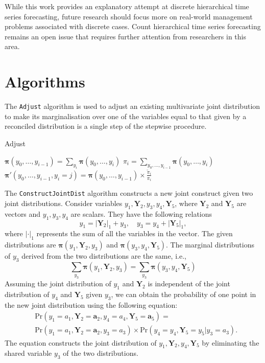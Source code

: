 \documentclass[a4paper,review,12pt,authoryear]{elsarticle}
\let\code=\texttt
\newcommand{\bY}{\mathbf{Y}}
\newcommand{\bpi}{\bm{\pi}}
\begin{document}
     
     While this work provides an explanatory attempt at discrete hierarchical time series forecasting, future research should focus more on real-world management problems associated with discrete cases. Count hierarchical time series forecasting remains an open issue that requires further attention from researchers in this area.


\newpage

\appendix

\section{Algorithms}
\label{appendix:adjust}

The \code{Adjust} algorithm is used to adjust an existing multivariate joint distribution to make its marginalisation over one of the variables equal to that given by a reconciled distribution is a single step of the stepwise procedure.

\begin{algorithm}[H]
  \label{alg:adjust}
  \caption{Adjust}
  \Input{$\bpi(y_0,y_1,\dots,y_i), \tilde\pi_i, y_i \in \{0,1,\dots,k_i\}$}

  $\bpi(y_0,\dots,y_{i-1}) = \sum_{y_i}\bpi(y_0,\dots,y_i)$\;
  $\pi_i = \sum_{y_0,\dots,y_{i-1}}\bpi(y_0,\dots,y_i)$ \;
   {
    $\bpi'(y_0,\dots,y_{i-1}, y_i=j) = \bpi(y_0,\dots,y_{i-1}) \times \frac{\tilde\pi_i}{\pi_i}$ \;
  }

  \Output{$\bpi'(y_0,\dots,y_i)$}
  
 \end{algorithm}


 The \code{ConstructJointDist} algorithm constructs a new joint construct given two joint distributions. 
 Consider variables $y_1, \bY_2, y_3, y_4, \bY_5$, where $\bY_2$ and $\bY_5$ are vectors and $y_1, y_3, y_4$ are scalars. 
 They have the following relations
 \[
  y_1 = |\bY_2|_1 + y_3, \quad y_3 = y_4 + |\bY_5|_1,
 \]
 where $|\cdot|_1$ represents the sum of all the variables in the vector.
 The given distributions are $\bpi(y_1, \bY_2, y_3)$ and $\bpi(y_3, y_4, \bY_5)$.
 The marginal distributions of $y_3$ derived from the two distributions are the same, i.e.,
 \[
  \sum_{y_3} \bpi(y_1, \bY_2, y_3) = \sum_{y_3}\bpi(y_3, y_4, \bY_5)
\]
 Assuming the joint distribution of $y_1$ and $\bY_2$ is independent of the joint distribution of $y_4$ and $\bY_5$ given $y_3$, we can obtain the probability of one point in the new joint distribution using the following equation: \[
   \begin{aligned}
  &\text{Pr}(y_1=a_1,\bY_2=\mathbf{a}_2, y_4=a_4, \bY_5 = \mathbf{a}_5) =\\ &\text{Pr} (y_1=a_1,\bY_2=\mathbf{a}_2,y_3=a_3) \times \text{Pr}(y_4=y_4,\bY_5=y_5|y_3=a_3).
   \end{aligned}
 \]
 The equation constructs the joint distribution of $y_1, \bY_2, y_4, \bY_5$ by eliminating the shared variable $y_3$ of the two distributions.

\newpage



\end{document}
